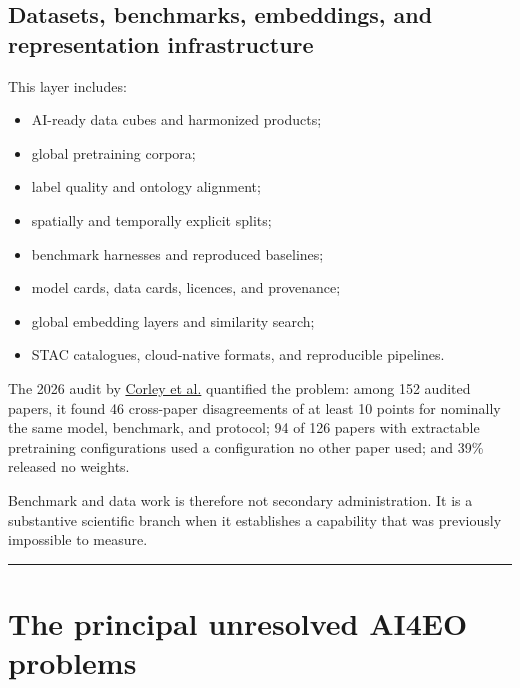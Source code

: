 \documentclass[
  a4paper,
  11pt]{article}
\providecommand{\tightlist}{%
  \setlength{\itemsep}{0pt}\setlength{\parskip}{0pt}}
\begin{document}
\hypertarget{datasets-benchmarks-embeddings-and-representation-infrastructure}{%
\subsection{Datasets, benchmarks, embeddings, and representation
infrastructure}\label{datasets-benchmarks-embeddings-and-representation-infrastructure}}

This layer includes:

\begin{itemize}
\tightlist
\item
  AI-ready data cubes and harmonized products;
\item
  global pretraining corpora;
\item
  label quality and ontology alignment;
\item
  spatially and temporally explicit splits;
\item
  benchmark harnesses and reproduced baselines;
\item
  model cards, data cards, licences, and provenance;
\item
  global embedding layers and similarity search;
\item
  STAC catalogues, cloud-native formats, and reproducible pipelines.
\end{itemize}

The 2026 audit by \href{https://arxiv.org/html/2605.12678v1}{Corley et
al.} quantified the problem: among 152 audited papers, it found 46
cross-paper disagreements of at least 10 points for nominally the same
model, benchmark, and protocol; 94 of 126 papers with extractable
pretraining configurations used a configuration no other paper used; and
39\% released no weights.

Benchmark and data work is therefore not secondary administration. It is
a substantive scientific branch when it establishes a capability that
was previously impossible to measure.

\begin{center}\rule{0.5\linewidth}{0.5pt}\end{center}

\hypertarget{the-principal-unresolved-ai4eo-problems}{%
\section{The principal unresolved AI4EO
problems}\label{the-principal-unresolved-ai4eo-problems}}
\end{document}
